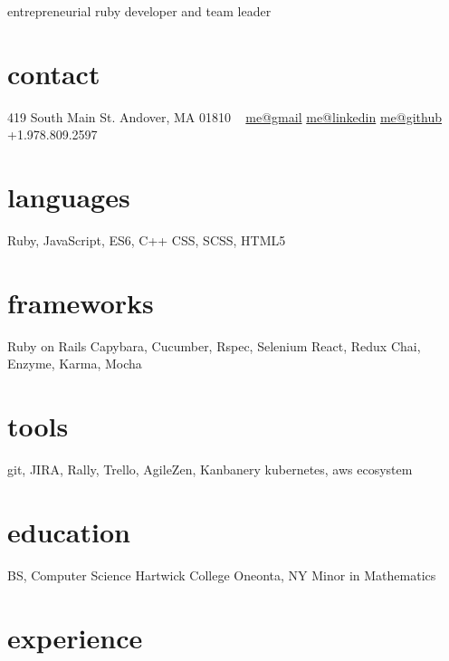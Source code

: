 \documentclass[]{friggeri-cv}
\begin{document}
       {entrepreneurial ruby developer and team leader}
       
\begin{aside}
  \section{contact}
    419 South Main St.
    Andover, MA 01810
    ~
    \href{mailto:wcdesmarais+resume@gmail.com}{me@gmail}
    \href{https://www.linkedin.com/in/billdesmarais}{me@linkedin}
    \href{https://github.com/bosoxbill}{me@github}
    ~
    +1.978.809.2597
  \section{languages}
    Ruby, JavaScript, 
    ES6, C++
    CSS, SCSS, HTML5
  \section{frameworks}
    Ruby on Rails
    Capybara, Cucumber, Rspec, Selenium
    React, Redux
    Chai, Enzyme, Karma, Mocha
  \section{tools}
    git, JIRA, Rally, Trello,
    AgileZen, Kanbanery
    kubernetes,
    aws ecosystem
  \section{education}
    BS, Computer Science
    Hartwick College
    Oneonta, NY
    Minor in Mathematics
\end{aside}

\section{experience}
\end{document}
